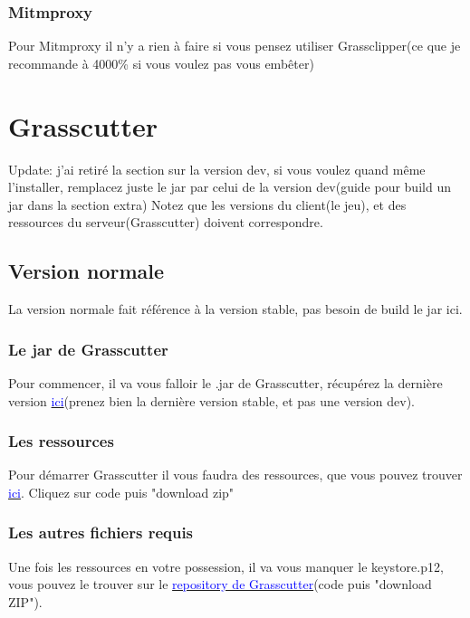 \documentclass{article}
\begin{document}
\subsubsection{Mitmproxy}
Pour Mitmproxy il n'y a rien à faire si vous pensez utiliser Grassclipper(ce que je recommande à 4000\% si vous voulez pas vous embêter)

\hrulefill

\section{Grasscutter}
Update: j'ai retiré la section sur la version dev, si vous voulez quand même l'installer, remplacez juste le jar par celui de la version dev(guide pour build un jar dans la section extra)\newline
Notez que les versions du client(le jeu), et des ressources du serveur(Grasscutter) doivent correspondre.

\subsection{Version normale}
La version normale fait référence à la version stable, pas besoin de build le jar ici.

\subsubsection{Le jar de Grasscutter}
Pour commencer, il va vous falloir le .jar de Grasscutter, récupérez la dernière version \href{https://github.com/Grasscutters/Grasscutter/releases}{\textcolor{blue}{ici}}(prenez bien la dernière version stable, et pas une version dev).

\subsubsection{Les ressources}
Pour démarrer Grasscutter il vous faudra des ressources, que vous pouvez trouver \href{https://github.com/Koko-boya/Grasscutter_Resources/tree/main}{\textcolor{blue}{ici}}. Cliquez sur code puis "download zip"

\subsubsection{Les autres fichiers requis}
Une fois les ressources en votre possession, il va vous manquer le keystore.p12, vous pouvez le trouver sur le \href{https://github.com/Grasscutters/Grasscutter/tree/stable}{\textcolor{blue}{repository de Grasscutter}}(code puis "download ZIP").\newline
\end{document}
